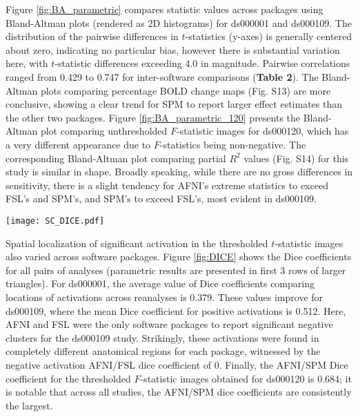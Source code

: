 Figure \ref{fig:BA_parametric} compares statistic values across packages using Bland-Altman plots (rendered as 2D histograms) for ds000001 and ds000109. The distribution of the pairwise differences in $t$-statistics (y-axes) is generally centered about zero, indicating no particular bias, however there is substantial variation here, with $t$-statistic differences exceeding 4.0 in magnitude. Pairwise correlations ranged from 0.429 to 0.747 for inter-software comparisons (\textbf{Table 2}). The Bland-Altman plots comparing percentage BOLD change maps (Fig. S13) are more conclusive, showing a clear trend for SPM to report larger effect estimates than the other two packages. Figure \ref{fig:BA_parametric_120} presents the Bland-Altman plot comparing unthresholded $F$-statistic images for ds000120, which has a very different appearance due to $F$-statistics being non-negative. The corresponding Bland-Altman plot comparing partial $R^{2}$ values (Fig. S14) for this study is similar in shape. Broadly speaking, while there are no gross differences in sensitivity, there is a slight tendency for AFNI's extreme statistics to exceed FSL's and SPM's, and SPM's to exceed FSL's, most evident in ds000109. 

\begin{sidewaysfigure}[htbp]
\centering
	\texttt{[image: SC\_DICE.pdf]}	
\caption{Cross-software Bland-Altman 2D histogram comparing the unthresholded main effect of time $F$-statistic maps computed in AFNI and SPM for reanalyses of the ds000120 study. The differences are generally centered about zero, with a trend of large $F$-statistics for AFNI. The funnel-like pattern is a consequence of the $F$-statistic taking on only positive values.}
\label{fig:DICE}
\end{sidewaysfigure}

Spatial localization of significant activation in the thresholded $t$-statistic images also varied across software packages. Figure \ref{fig:DICE} shows the Dice coefficients for all pairs of analyses (parametric results are presented in first 3 rows of larger triangles). For ds000001, the average value of Dice coefficients comparing locations of activations across reanalyses is 0.379. These values improve for ds000109, where the mean Dice coefficient for positive activations is 0.512. Here, AFNI and FSL were the only software packages to report significant negative clusters for the ds000109 study. Strikingly, these activations were found in completely different anatomical regions for each package, witnessed by the negative activation AFNI/FSL dice coefficient of 0. Finally, the AFNI/SPM Dice coefficient for the thresholded $F$-statistic images obtained for ds000120 is 0.684; it is notable that across all studies, the AFNI/SPM dice coefficients are consistently the largest.

